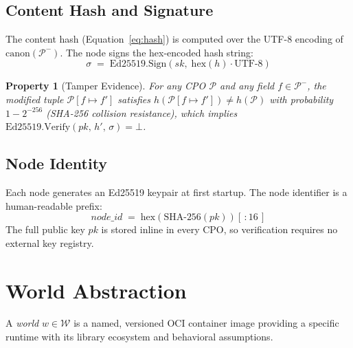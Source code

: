 \documentclass[11pt]{article}
\newtheorem{property}{Property}
\begin{document}
\subsection{Content Hash and Signature}

The content hash (Equation~\eqref{eq:hash}) is computed over the UTF-8
encoding of $\mathrm{canon}(\mathcal{P}^-)$.  The node signs the
hex-encoded hash string:
\[
  \sigma \;=\; \mathrm{Ed25519.Sign}(\mathit{sk},\;
    \mathrm{hex}(h) \cdot \text{UTF-8})
\]

\begin{property}[Tamper Evidence]
\label{prop:tamper}
For any CPO $\mathcal{P}$ and any field $f \in \mathcal{P}^-$, the
modified tuple $\mathcal{P}[f \mapsto f']$ satisfies
$h(\mathcal{P}[f \mapsto f']) \neq h(\mathcal{P})$ with probability
$1 - 2^{-256}$ (SHA-256 collision resistance), which implies
$\mathrm{Ed25519.Verify}(\mathit{pk},\, h',\, \sigma) = \bot$.
\end{property}

\subsection{Node Identity}

Each node generates an Ed25519 keypair at first startup.  The node
identifier is a human-readable prefix:
\[
  \textit{node\_id} \;=\;
    \mathrm{hex}(\mathrm{SHA\text{-}256}(\mathit{pk}))[\,{:}16\,]
\]
The full public key $\mathit{pk}$ is stored inline in every CPO, so
verification requires no external key registry.

\section{World Abstraction}
\label{sec:worlds}

A \emph{world} $w \in \mathcal{W}$ is a named, versioned OCI container
image providing a specific runtime with its library ecosystem and
behavioral assumptions.
\end{document}

